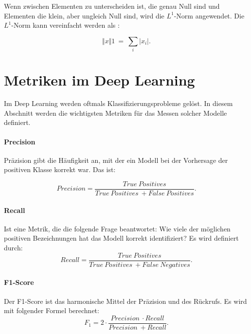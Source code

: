         Wenn zwischen Elementen zu unterscheiden ist, die genau Null sind und Elementen die klein, aber ungleich Null sind, wird die $L^1$-Norm angewendet. Die $L^1$-Norm kann vereinfacht werden als \cite*[40]{IanGoodfellowYoshuaBengio2016}:

        \begin{equation} \label{FormelNorm1}
            \Vert x\Vert 1\ =\ \sum _{i}\bigr| x_{i}\bigr|.
        \end{equation}

\section{Metriken im Deep Learning}
Im Deep Learning werden oftmals Klassifizierungsprobleme gelöst. In diesem Abschnitt werden die wichtigsten Metriken für das Messen solcher Modelle definiert.
\paragraph{Precision}
Präzision gibt die Häufigkeit an, mit der ein Modell bei der Vorhersage der positiven Klasse korrekt war. Das ist:

\begin{equation} \label{Preci}
             Precision =  \frac{True\ Positives}{True\ Positives\ + False\ Positives}.
        \end{equation}
\paragraph{Recall}
Ist eine Metrik, die die folgende Frage beantwortet: Wie viele der möglichen positiven Bezeichnungen hat das Modell korrekt identifiziert? Es wird definiert durch:
\begin{equation} \label{Recall}
             Recall =  \frac{True\ Positives}{True\ Positives\ + False\ Negatives}.
        \end{equation}


\paragraph{F1-Score}
Der F1-Score ist das harmonische Mittel der Präzision und des Rückrufs. Es wird mit folgender Formel berechnet:
\begin{equation} \label{F1Score}
             F_1 =  2 \cdot \frac{Precision\ \cdot Recall}{Precision\  + Recall}.
        \end{equation}
        

